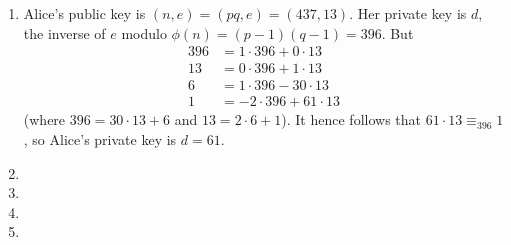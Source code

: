 \begin{enumerate}
\item Alice's public key is $(n,e)=(pq,e)=(437,13)$. Her private key is
$d$, the inverse of $e$ modulo $\phi(n)=(p-1)(q-1)=396$. But
\begin{align*}
	396 &= 1 \cdot 396 + 0 \cdot 13 \\
	13 &= 0 \cdot 396 +1 \cdot 13 \\
	6 &=  1 \cdot 396 - 30 \cdot 13 \\
	1 &= -2 \cdot 396 + 61 \cdot 13
\end{align*}
(where $396=30\cdot 13 + 6$ and $13=2 \cdot 6 + 1$). It hence
follows that $61 \cdot 13 \equiv_{396} 1$, so Alice's private key is $d=61$.

\item

\item

\item

\item

\end{enumerate}
